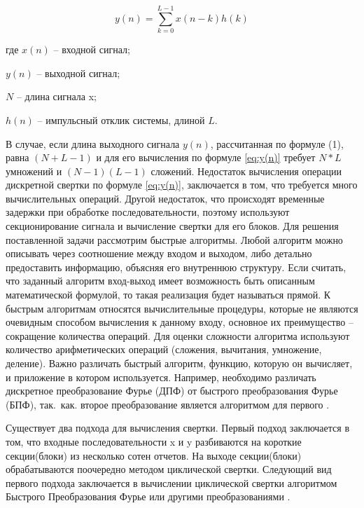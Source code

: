 \begin{equation}
\label{eq:y(n)}
	y(n) = \sum_{k=0}^{L-1}x(n-k)h(k)
\end{equation}

где $x(n)$ -- входной сигнал;

$y(n)$ -- выходной сигнал; 

$N$ -- длина сигнала x;

$h(n)$ -- импульсный отклик системы, длиной $L$. 

В случае, если длина выходного сигнала $y(n)$,  рассчитанная по формуле (1), равна $(N+L-1)$ и для его вычисления по формуле \ref{eq:y(n)} требует $N*L$ умножений и $(N-1)(L-1)$ сложений. 
Недостаток вычисления операции дискретной свертки по формуле \ref{eq:y(n)}, заключается в том, что требуется много вычислительных операций. Другой недостаток, что происходят временные задержки при обработке последовательности, поэтому используют секционирование сигнала и вычисление свертки для его блоков.
Для решения поставленной задачи рассмотрим быстрые алгоритмы. Любой алгоритм можно описывать через соотношение между входом и выходом, либо детально предоставить информацию, объясняя его внутреннюю структуру. Если считать, что заданный алгоритм вход-выход  имеет возможность  быть описанным математической формулой, то такая реализация будет называться прямой. К быстрым алгоритмам относятся вычислительные процедуры, которые не являются очевидным способом вычисления к данному входу, основное их преимущество – сокращение количества операций.  Для оценки сложности алгоритма используют количество арифметических операций (сложения, вычитания, умножение, деление). Важно различать быстрый алгоритм, функцию, которую он вычисляет, и приложение в котором используется. Например, необходимо различать дискретное преобразование Фурье (ДПФ) от быстрого преобразования Фурье (БПФ), так.~как.  второе преобразование является  алгоритмом для первого \cite{bluehut1989fast}. 

Существует два подхода для вычисления свертки. Первый подход заключается в том, что входные последовательности x и y разбиваются на короткие секции(блоки) из несколько сотен отчетов. На выходе секции(блоки) обрабатываются поочередно методом циклической свертки. Следующий вид первого подхода заключается в вычислении циклической свертки алгоритмом Быстрого Преобразования Фурье или другими преобразованиями \cite{bluehut1989fast, Rabiner1978theory, Quick_conversion_1985, Oppenheim2018Digital}.

